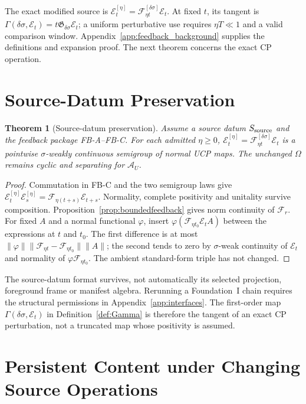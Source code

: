 \documentclass[12pt]{article}
\newtheorem{theorem}{Theorem}[section]
\theoremstyle{definition}
\theoremstyle{remark}
\begin{document}
The exact modified source is
$\mathcal E_t^{[\eta]}=\mathscr F_{\eta t}^{[\delta\sigma]}\mathcal E_t$.
At fixed $t$, its tangent is
$\Gamma(\delta\sigma,\mathcal E_t)=t\mathfrak G_{\delta\sigma}\mathcal E_t$;
a uniform perturbative use requires $\eta T\ll1$ and a valid comparison
window. Appendix~\ref{app:feedback_background} supplies the definitions
and expansion proof. The next theorem concerns the exact CP operation.

\section{Source-Datum Preservation}\label{sec:preservation}

\begin{theorem}[Source-datum preservation]\label{thm:preserve}
Assume a source datum $S_{\rm source}$ and the feedback package
FB-A--FB-C. For each admitted $\eta\ge0$,
$\mathcal E_t^{[\eta]}=\mathscr F_{\eta t}^{[\delta\sigma]}\mathcal E_t$
is a pointwise $\sigma$-weakly continuous semigroup of normal UCP
maps. The unchanged $\Omega$ remains cyclic and separating for
$\mathcal A_U$.
\end{theorem}
\begin{proof}
Commutation in FB-C and the two semigroup laws give
$\mathcal E_t^{[\eta]}\mathcal E_s^{[\eta]}
=\mathscr F_{\eta(t+s)}\mathcal E_{t+s}$.
Normality, complete positivity and unitality survive composition.
Proposition~\ref{prop:boundedfeedback} gives norm continuity of
$\mathscr F_r$. For fixed $A$ and a normal functional $\varphi$, insert
$\varphi(\mathscr F_{\eta t_0}\mathcal E_t A)$ between the expressions
at $t$ and $t_0$. The first difference is at most
$\|\varphi\|\|\mathscr F_{\eta t}-\mathscr F_{\eta t_0}\|\|A\|$;
the second tends to zero by $\sigma$-weak continuity of $\mathcal E_t$
and normality of $\varphi\mathscr F_{\eta t_0}$.
The ambient standard-form triple has not changed.
\end{proof}

The source-datum format survives, not automatically its selected
projection, foreground frame or manifest algebra. Rerunning a
Foundation~I chain requires the structural permissions in
Appendix~\ref{app:interfaces}.
The first-order map $\Gamma(\delta\sigma,\mathcal E_t)$ in
Definition~\ref{def:Gamma} is therefore the tangent of an exact
CP perturbation, not a truncated map whose positivity is assumed.

\section{Persistent Content under Changing Source Operations}\label{sec:persistence}
\end{document}
